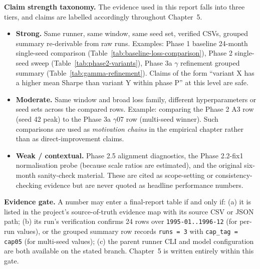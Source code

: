 \textbf{Claim strength taxonomy.} The evidence used in this report falls into three tiers, and claims are labelled accordingly throughout Chapter~5.

\begin{itemize}
 \item \textbf{Strong.} Same runner, same window, same seed set, verified CSVs, grouped summary re-derivable from raw runs. Examples: Phase 1 baseline 24-month single-seed comparison (Table~\ref{tab:baseline-loss-comparison}), Phase 2 single-seed sweep (Table~\ref{tab:phase2-variants}), Phase 3a $\gamma$ refinement grouped summary (Table~\ref{tab:gamma-refinement}). Claims of the form ``variant X has a higher mean Sharpe than variant Y within phase P'' at this level are safe.
 \item \textbf{Moderate.} Same window and broad loss family, different hyperparameters or seed sets across the compared rows. Example: comparing the Phase 2 A3 row (seed 42 peak) to the Phase 3a $\gamma$07 row (multi-seed winner). Such comparisons are used as \emph{motivation chains} in the empirical chapter rather than as direct-improvement claims.
 \item \textbf{Weak / contextual.} Phase 2.5 alignment diagnostics, the Phase 2.2-fix1 normalisation probe (because scale ratios are estimated), and the original six-month sanity-check material. These are cited as scope-setting or consistency-checking evidence but are never quoted as headline performance numbers.
\end{itemize}

\textbf{Evidence gate.} A number may enter a final-report table if and only if: (a) it is listed in the project's source-of-truth evidence map with its source CSV or JSON path; (b) its run's verification confirms 24 rows over \texttt{1995-01..1996-12} (for per-run values), or the grouped summary row records \texttt{runs = 3} with \texttt{cap\_tag = cap05} (for multi-seed values); (c) the parent runner CLI and model configuration are both available on the stated branch. Chapter~5 is written entirely within this gate.
